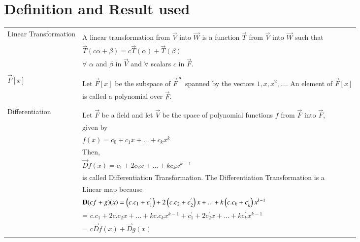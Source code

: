 \documentclass[journal,12pt,twocolumn]{IEEEtran}
\newcommand\myemptypage{
	\null
	\thispagestyle{empty}
	\addtocounter{page}{-1}
	\newpage
}
\begin{document}
\section{Definition and Result used}
\pagebreak
\myemptypage
\begin{table}[hp]
	\begin{tabular}{|l|l|}
	\hline
	\multirow{3}{*}{Linear Transformation} & \\
	& A linear transformation from $\vec{V}$ into $\vec{W}$ is a function $\vec{T}$ from $\vec{V}$ into $\vec{W}$ such that \\
	& \qquad \qquad \qquad \qquad \qquad $\vec{T}(c\alpha + \beta) = c\vec{T}(\alpha) + \vec{T}(\beta)$  \\
	& $\forall$ $\alpha$ and $\beta$ in $\vec{V}$ and $\forall$ scalars $c$ in $\vec{F}$. \\
	& \\
	\hline
	\multirow{3}{*}{\qquad \qquad $\vec{F}[x]$} & \\
	& Let $\vec{F}[x]$ be the subspace of $\vec{F}^{\infty}$ spanned by the vectors $1, x, x^2,...$. An element of $\vec{F}[x]$ \\
	& is called a polynomial over $\vec{F}$. \\
	& \\
	\hline
	\multirow{3}{*}{\qquad Differentiation} & \\
	& Let $\vec{F}$ be a field and let $\vec{V}$ be the space of polynomial functions $f$ from $\vec{F}$ into $\vec{F}$,\\
\qquad Transformation & given by \\
    & \qquad \qquad \qquad  $f(x) = c_0 + c_1x + . . . + c_kx^k$\\  
    & Then,\\
    &\qquad \qquad \qquad $\vec{D}f(x) = c_1 + 2c_2x + ...+ kc_kx^{k-1} $\\
    & is called Differentiation Transformation. The Differentiation Transformation is a \\
	& Linear map because \\
	& \qquad \qquad \qquad $\mathbf{D}(cf+g)(x) = \left(c.c_1 + c_1^{'}\right) + 2\left(c.c_2 + c_2^{'}\right)x + ... + k\left(c.c_k + c_k^{,}\right)x^{k-1}$ \\
    & \qquad \qquad \qquad \qquad \qquad \qquad = $c.c_1 + 2c.c_2x + ... + kc.c_kx^{k-1} + c_1^{'} + 2c_2^{'}x + ... + kc_k^{'}x^{k-1}$ \\	
    & \qquad \qquad \qquad \qquad \qquad \qquad = c$\vec{D}f(x) + \vec{D}g(x)$ \label{2}\\
    &\\
    \hline
\end{tabular}
\end{table}
\pagebreak
\myemptypage
\end{document}
